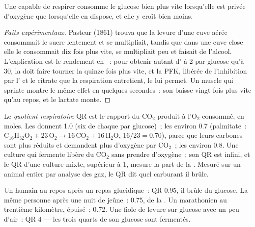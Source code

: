 \begin{proposition}\label{prop:b1:respiration-fermentation:pasteur}
Une  capable de respirer consomme le glucose bien plus vite
lorsqu'elle est privée d'oxygène que lorsqu'elle en dispose, et elle y
croît bien moins.
\end{proposition}
\begin{proof}[Faits expérimentaux]
Pasteur (1861) trouva que la levure d'une cuve aérée consommait le sucre
lentement et se multipliait, tandis que dans une cuve close elle le
consommait dix fois plus vite, se multipliait peu et faisait de
l'alcool. L'explication est le rendement en ~: pour obtenir autant
d' à 2 par glucose qu'à 30, la  doit faire tourner la
 quinze fois plus vite, et la PFK, libérée de l'inhibition par
l' et le citrate que la respiration entretient, le lui permet. Un
muscle qui sprinte montre le même effet en quelques secondes~: son
 baisse vingt fois plus vite qu'au repos, et le lactate monte.
\end{proof}

\begin{definition}\label{def:b1:respiration-fermentation:rq}
Le \emph{quotient respiratoire} QR est le rapport du $\mathrm{CO_2}$
produit à l'$\mathrm{O_2}$ consommé, en moles. Les  donnent 1.0
(six de chaque par glucose)~; les  environ 0.7 (palmitate~:
$\mathrm{C_{16}H_{32}O_2} + 23\,\mathrm{O_2} \to 16\,\mathrm{CO_2} +
16\,\mathrm{H_2O}$, $16/23 = 0.70$), parce que leurs carbones sont plus
réduits et demandent plus d'oxygène par $\mathrm{CO_2}$~; les 
environ 0.8. Une culture qui fermente libère du $\mathrm{CO_2}$ sans
prendre d'oxygène~: son QR est infini, et le QR d'une culture mixte,
supérieur à 1, mesure la part de la . Mesuré sur un animal
entier par analyse des gaz, le QR dit quel carburant il brûle.
\end{definition}

\begin{example}[Lire un QR]\label{ex:b1:respiration-fermentation:readrq}
Un humain au repos après un repas glucidique~: QR 0.95, il brûle du
glucose. La même personne après une nuit de jeûne~: 0.75, de la .
Un marathonien au trentième kilomètre,  épuisé~: 0.72. Une
fiole de levure sur glucose avec un peu d'air~: QR 4 --- les trois
quarts de son glucose sont fermentés.
\end{example}

